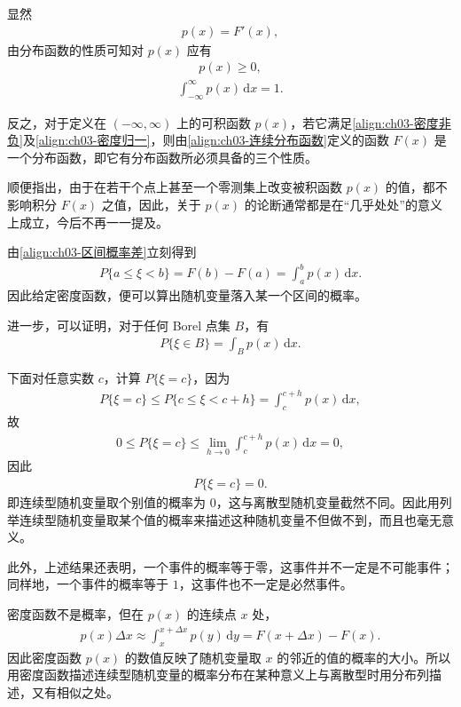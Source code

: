 \documentclass[../../main.tex]{subfiles}
\begin{document}
显然
\begin{align}
p(x)=F'(x),\label{align:ch03-密度导数}
\end{align}
由分布函数的性质可知对 $p(x)$ 应有
\begin{align}
p(x)\geqslant 0,\label{align:ch03-密度非负}
\end{align}
\begin{align}
\int_{-\infty}^{\infty}p(x)\,\mathrm{d}x=1.\label{align:ch03-密度归一}
\end{align}

反之，对于定义在 $(-\infty,\infty)$ 上的可积函数 $p(x)$，若它满足\eqref{align:ch03-密度非负}及\eqref{align:ch03-密度归一}，则由\eqref{align:ch03-连续分布函数}定义的函数 $F(x)$ 是一个分布函数，即它有分布函数所必须具备的三个性质。

顺便指出，由于在若干个点上甚至一个零测集上改变被积函数 $p(x)$ 的值，都不影响积分 $F(x)$ 之值，因此，关于 $p(x)$ 的论断通常都是在“几乎处处”的意义上成立，今后不再一一提及。

由\eqref{align:ch03-区间概率差}立刻得到
\begin{align}
P\{a\leqslant\xi<b\}=F(b)-F(a)=\int_{a}^{b}p(x)\,\mathrm{d}x.\label{align:ch03-密度区间概率}
\end{align}
因此给定密度函数，便可以算出随机变量落入某一个区间的概率。

进一步，可以证明，对于任何 Borel 点集 $B$，有
\begin{align}
P\{\xi\in B\}=\int_{B}p(x)\,\mathrm{d}x.\label{align:ch03-密度Borel概率}
\end{align}

下面对任意实数 $c$，计算 $P\{\xi=c\}$，因为
\begin{align*}
P\{\xi=c\}\leqslant P\{c\leqslant\xi<c+h\}=\int_{c}^{c+h}p(x)\,\mathrm{d}x,
\end{align*}
故
\begin{align*}0\leqslant P\{\xi=c\}\leqslant\lim_{h\to 0}\int_{c}^{c+h}p(x)\,\mathrm{d}x=0,\end{align*}
因此
\begin{align*}P\{\xi=c\}=0.\end{align*}
即连续型随机变量取个别值的概率为 $0$，这与离散型随机变量截然不同。因此用列举连续型随机变量取某个值的概率来描述这种随机变量不但做不到，而且也毫无意义。

此外，上述结果还表明，一个事件的概率等于零，这事件并不一定是不可能事件；同样地，一个事件的概率等于 $1$，这事件也不一定是必然事件。

密度函数不是概率，但在 $p(x)$ 的连续点 $x$ 处，
\begin{align}
p(x)\Delta x\approx\int_{x}^{x+\Delta x}p(y)\,\mathrm{d}y=F(x+\Delta x)-F(x).\label{align:ch03-密度概率意义}
\end{align}
因此密度函数 $p(x)$ 的数值反映了随机变量取 $x$ 的邻近的值的概率的大小。所以用密度函数描述连续型随机变量的概率分布在某种意义上与离散型时用分布列描述，又有相似之处。
\end{document}
